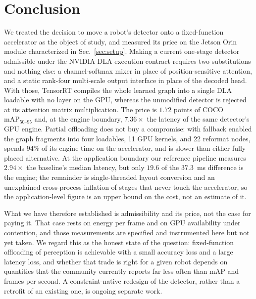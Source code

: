 \section{Conclusion}
\label{sec:conclusion}

We treated the decision to move a robot's detector onto a fixed-function
accelerator as the object of study, and measured its price on the Jetson Orin
module characterized in Sec.~\ref{sec:setup}. Making a current one-stage detector admissible under the NVIDIA DLA
execution contract requires two substitutions and nothing else: a channel-softmax
mixer in place of position-sensitive attention, and a static rank-four
multi-scale output interface in place of the decoded head. With those, TensorRT
compiles the whole learned graph into a single DLA loadable with no layer on the
GPU, whereas the unmodified detector is rejected at its attention matrix
multiplication. The price is $1.72$ points of COCO
$\mathrm{mAP}_{50\text{--}95}$ and, at the engine boundary, $7.36\times$ the
latency of the same detector's GPU engine. Partial offloading does not buy a
compromise: with fallback enabled the graph fragments into four loadables, 11
GPU kernels, and 22 reformat nodes, spends $94\%$ of its engine time on the
accelerator, and is slower than either fully placed alternative. At the
application boundary our reference pipeline measures $2.94\times$ the baseline's
median latency, but only $19.6$ of the $37.3$~ms difference is the engine; the
remainder is single-threaded layout conversion and an unexplained cross-process
inflation of stages that never touch the accelerator, so the application-level
figure is an upper bound on the cost, not an estimate of it.

What we have therefore established is admissibility and its price, not the case
for paying it. That case rests on energy per frame and on GPU availability under
contention, and those measurements are specified and instrumented here but not
yet taken. We regard this as the honest state of the question: fixed-function
offloading of perception is achievable with a small accuracy loss and a large
latency loss, and whether that trade is right for a given robot depends on
quantities that the community currently reports far less often than
$\mathrm{mAP}$ and frames per second. A constraint-native redesign of the
detector, rather than a retrofit of an existing one, is ongoing separate work.
